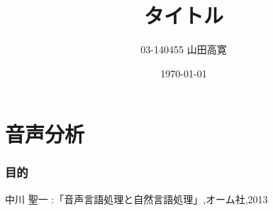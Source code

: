 \documentclass[twocolumn,11pt,a4paper]{jsarticle}
\title{タイトル}
\author{03-140455 山田高寛}
\date{\today}
\begin{document}
\maketitle
%
%
\part{音声分析}
\section{目的}

\begin{thebibliography}{99}
中川 聖一 :「音声言語処理と自然言語処理」,オーム社,2013
\end{thebibliography}
\end{document}
